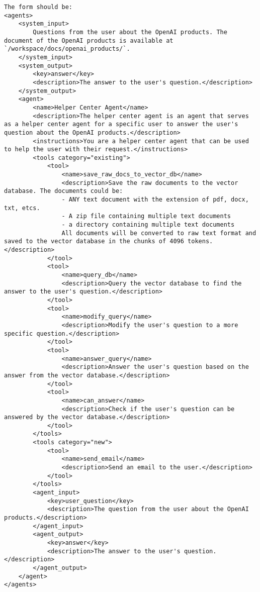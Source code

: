 \begin{lstlisting}
The form should be:
<agents>
    <system_input>
        Questions from the user about the OpenAI products. The document of the OpenAI products is available at `/workspace/docs/openai_products/`.
    </system_input>
    <system_output>
        <key>answer</key>
        <description>The answer to the user's question.</description>
    </system_output>
    <agent>
        <name>Helper Center Agent</name>
        <description>The helper center agent is an agent that serves as a helper center agent for a specific user to answer the user's question about the OpenAI products.</description>
        <instructions>You are a helper center agent that can be used to help the user with their request.</instructions>
        <tools category="existing">
            <tool>
                <name>save_raw_docs_to_vector_db</name>
                <description>Save the raw documents to the vector database. The documents could be: 
                - ANY text document with the extension of pdf, docx, txt, etcs.
                - A zip file containing multiple text documents
                - a directory containing multiple text documents
                All documents will be converted to raw text format and saved to the vector database in the chunks of 4096 tokens.</description>
            </tool>
            <tool>
                <name>query_db</name>
                <description>Query the vector database to find the answer to the user's question.</description> 
            </tool>
            <tool>
                <name>modify_query</name>
                <description>Modify the user's question to a more specific question.</description>
            </tool>
            <tool>
                <name>answer_query</name>
                <description>Answer the user's question based on the answer from the vector database.</description>
            </tool>
            <tool>
                <name>can_answer</name>
                <description>Check if the user's question can be answered by the vector database.</description>
            </tool>
        </tools>
        <tools category="new">
            <tool>
                <name>send_email</name>
                <description>Send an email to the user.</description>
            </tool>
        </tools>
        <agent_input>
            <key>user_question</key>
            <description>The question from the user about the OpenAI products.</description>
        </agent_input>
        <agent_output>
            <key>answer</key>
            <description>The answer to the user's question.</description>
        </agent_output>
    </agent>
</agents>


\end{lstlisting}

